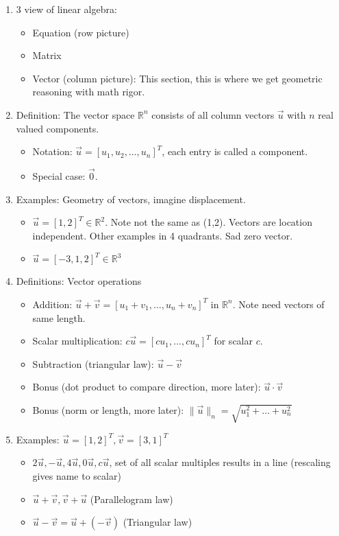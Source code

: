 \documentclass{article}
\begin{document}
\begin{enumerate}

\item 3 view of linear algebra:
\begin{itemize}
\item Equation (row picture)
\item Matrix 
\item Vector (column picture): This section, this is where we get geometric reasoning with math rigor.
\end{itemize}

\item Definition: The vector space $\mathbb{R}^n$ consists of all column vectors $\vec{u}$ with $n$ real valued components.
\begin{itemize}
\item Notation: $\vec{u} = [u_1, u_2, \dots, u_n]^T$, each entry is called a component.
\item Special case: $\vec{0}$.
\end{itemize}

\item Examples: Geometry of vectors, imagine displacement.
\begin{itemize}
\item $\vec{u} = [1,2]^T \in \mathbb{R}^2$. Note not the same as (1,2). Vectors are location independent. Other examples in 4 quadrants. Sad zero vector.
\item $\vec{u} = [-3,1,2]^T \in \mathbb{R}^3$
\end{itemize}

\item Definitions: Vector operations
\begin{itemize}
\item Addition: $\vec{u} + \vec{v} = [u_1+v_1, \dots, u_n+v_n]^T$ in $\mathbb{R}^n$. Note need vectors of same length.
\item Scalar multiplication: $c \vec{u} = [c u_1, \dots, c u_n]^T$ for scalar $c$.
\item Subtraction (triangular law): $\vec{u}-\vec{v}$
\item Bonus (dot product to compare direction, more later): $\vec{u} \cdot \vec{v}$
\item Bonus (norm or length, more later): $\| \vec{u} \|_n = \sqrt{u_1^2 + \dots + u_n^2}$
\end{itemize}

\item Examples: $\vec{u} = [1,2]^T, \vec{v} = [3,1]^T$
\begin{itemize}
\item $2\vec{u}, -\vec{u}, 4\vec{u}, 0\vec{u}, c\vec{u}$, set of all scalar multiples results in a line (rescaling gives name to scalar)
\item $\vec{u}+\vec{v}, \vec{v}+\vec{u}$ (Parallelogram law)
\item $\vec{u}-\vec{v} = \vec{u}+(-\vec{v})$ (Triangular law)
\end{itemize}


\end{enumerate}
\end{document}
